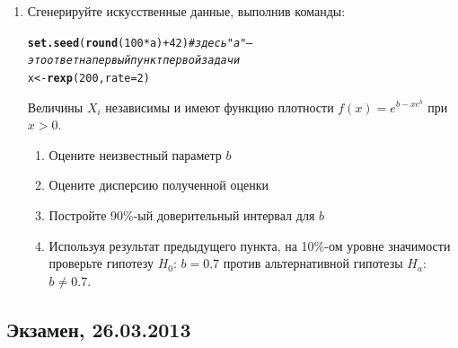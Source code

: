 \documentclass[12pt, a4paper]{article}\usepackage[]{graphicx}\usepackage[]{color}
\makeatletter
\newcommand{\hlnum}[1]{\textcolor[rgb]{0.686,0.059,0.569}{#1}}%
\newcommand{\hlcom}[1]{\textcolor[rgb]{0.678,0.584,0.686}{\textit{#1}}}%
\newcommand{\hlopt}[1]{\textcolor[rgb]{0,0,0}{#1}}%
\newcommand{\hlstd}[1]{\textcolor[rgb]{0.345,0.345,0.345}{#1}}%
\newcommand{\hlkwb}[1]{\textcolor[rgb]{0.69,0.353,0.396}{#1}}%
\newcommand{\hlkwc}[1]{\textcolor[rgb]{0.333,0.667,0.333}{#1}}%
\newcommand{\hlkwd}[1]{\textcolor[rgb]{0.737,0.353,0.396}{\textbf{#1}}}%
\newenvironment{kframe}{%
	\def\at@end@of@kframe{}%
	\ifinner\ifhmode%
	\def\at@end@of@kframe{\end{minipage}}%
\begin{minipage}{\columnwidth}%
	\fi\fi%
	\def\FrameCommand##1{\hskip\@totalleftmargin \hskip-\fboxsep
		\colorbox{shadecolor}{##1}\hskip-\fboxsep
		\hskip-\linewidth \hskip-\@totalleftmargin \hskip\columnwidth}%
	\MakeFramed {\advance\hsize-\width
		\@totalleftmargin\z@ \linewidth\hsize
		\@setminipage}}%
{\par\unskip\endMakeFramed%
	\at@end@of@kframe}
\newenvironment{knitrout}{}{} %
\makeatother
\begin{document}
\begin{enumerate}
					\item Сгенерируйте искусственные данные, выполнив команды:
					\begin{knitrout}
						\color{fgcolor}\begin{kframe}
							\begin{alltt}
								\hlkwd{set.seed}\hlstd{(}\hlkwd{round}\hlstd{(}\hlnum{100} \hlopt{*} \hlstd{a)} \hlopt{+} \hlnum{42}\hlstd{)} \hlcom{# здесь "a" — это ответ на первый пункт первой задачи}
								\hlstd{x} \hlkwb{<-} \hlkwd{rexp}\hlstd{(}\hlnum{200}\hlstd{,} \hlkwc{rate} \hlstd{=} \hlnum{2}\hlstd{)}
							\end{alltt}
						\end{kframe}
					\end{knitrout}

					Величины $X_i$ независимы и имеют функцию плотности $f(x)=e^{b-xe^b}$ при $x>0$.
					\begin{enumerate}
						\item Оцените неизвестный параметр $b$
						\item Оцените дисперсию полученной оценки
						\item Постройте 90\%-ый доверительный интервал для $b$
						\item Используя результат предыдущего пункта, на 10\%-ом уровне значимости проверьте гипотезу $H_0$: $b=0.7$ против альтернативной гипотезы $H_a$: $b\neq 0.7$.
					\end{enumerate}

				\end{enumerate}


				\subsection{Экзамен, 26.03.2013}
\end{document}
